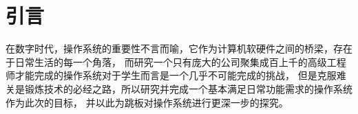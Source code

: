 \chapter{引言}
在数字时代，操作系统的重要性不言而喻，它作为计算机软硬件之间的桥梁，存在于日常生活的每一个角落，
而研究一个只有庞大的公司聚集成百上千的高级工程师才能完成的操作系统对于学生而言是一个几乎不可能完成的挑战，
但是克服难关是锻炼技术的必经之路，所以研究并完成一个基本满足日常功能需求的操作系统作为此次的目标，
并以此为跳板对操作系统进行更深一步的探究。